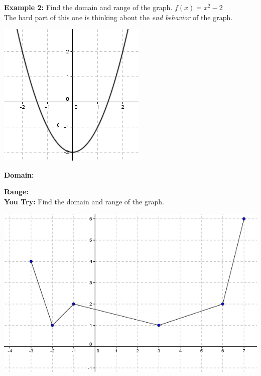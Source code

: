 \documentclass[12pt]{article}
\begin{document}
\textbf{Example 2:} Find the domain and range of the graph. $f(x)=x^{2}-2$\\

The hard part of this one is thinking about the \textit{end behavior} of the graph.

\begin{center}
\includegraphics[scale=.5]{domain2.png}\\
\end{center}

\textbf{Domain:}

\vspace{1cm}

\textbf{Range:}\\




\textbf{You Try:} Find the domain and range of the graph.\\

\begin{center}
\includegraphics[scale=.5]{domain4.png}\\
\end{center}
\end{document}
